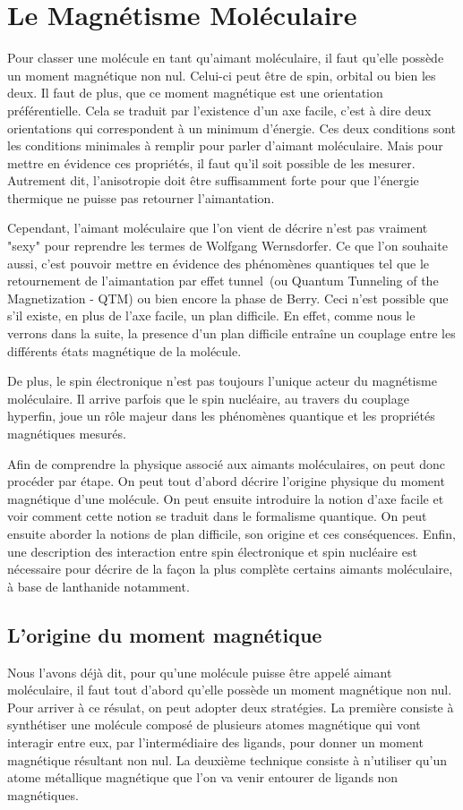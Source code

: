 \chapter{Le Magnétisme Moléculaire}

Pour classer une molécule en tant qu'aimant moléculaire, il faut qu'elle possède un moment magnétique non nul. Celui-ci peut \^etre de spin, orbital ou bien les deux. Il faut de plus, que ce moment magnétique est une orientation préférentielle. Cela se traduit par l'existence d'un axe facile, c'est à dire deux orientations qui correspondent à un minimum d'énergie. Ces deux conditions sont les conditions minimales à remplir pour parler d'aimant moléculaire. Mais pour mettre en évidence ces propriétés, il faut qu'il soit possible de les mesurer. Autrement dit, l'anisotropie doit \^etre suffisamment forte pour que l'énergie thermique ne puisse pas retourner l'aimantation.

Cependant, l'aimant moléculaire que l'on vient de décrire n'est pas vraiment "sexy" pour reprendre les termes de Wolfgang Wernsdorfer. Ce que l'on souhaite aussi, c'est pouvoir mettre en évidence des phénomènes quantiques tel que le retournement de l'aimantation par effet tunnel~(ou Quantum Tunneling of the Magnetization - QTM) ou bien encore la phase de Berry. Ceci n'est possible que s'il existe, en plus de l'axe facile, un plan difficile. En effet, comme nous le verrons dans la suite, la presence d'un plan difficile entraîne un couplage entre les différents états magnétique de la molécule.

De plus, le spin électronique n'est pas toujours l'unique acteur du magnétisme moléculaire. Il arrive parfois que le spin nucléaire, au travers du couplage hyperfin, joue un r\^ole majeur dans les phénomènes quantique et les propriétés magnétiques mesurés.

Afin de comprendre la physique associé aux aimants moléculaires, on peut donc procéder par étape. On peut tout d'abord décrire l'origine physique du moment magnétique d'une molécule. On peut ensuite introduire la notion d'axe facile et voir comment cette notion se traduit dans le formalisme quantique. On peut ensuite aborder la notions de plan difficile, son origine et ces conséquences. Enfin, une description des interaction entre spin électronique et spin nucléaire est nécessaire pour décrire de la façon la plus complète certains aimants moléculaire, à base de lanthanide notamment.

\section{L'origine du moment magnétique}
Nous l'avons déjà dit, pour qu'une molécule puisse \^etre appelé aimant moléculaire, il faut tout d'abord qu'elle possède un moment magnétique non nul. Pour arriver à ce résulat, on peut adopter deux stratégies. La première consiste à synthétiser une molécule composé de plusieurs atomes magnétique qui vont interagir entre eux, par l'intermédiaire des ligands, pour donner un moment magnétique résultant non nul. La deuxième technique consiste à n'utiliser qu'un atome métallique magnétique que l'on va venir entourer de ligands non magnétiques.

